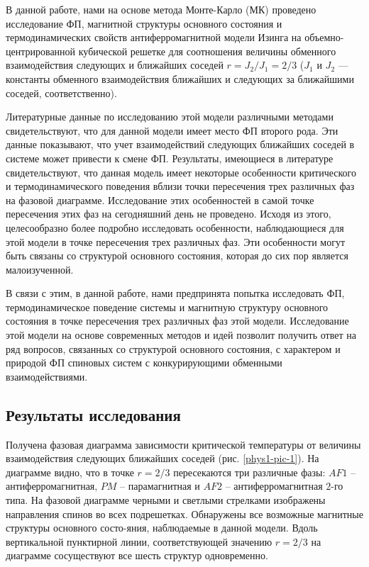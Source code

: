 В данной работе, нами на основе метода Монте-Карло (МК) проведено исследование ФП, магнитной структуры основного состояния и термодинамических свойств антиферромагнитной модели Изинга на объемно-центрированной кубической решетке для соотношения величины обменного взаимодействия следующих и ближайших соседей $r=J_2/J_1=2/3$ ($J_1$ и $J_2$ --- константы обменного взаимодействия ближайших и следующих за ближайшими соседей, соответственно).

Литературные данные по исследованию этой модели различными методами свидетельствуют, что для данной модели имеет место ФП второго рода. Эти данные показывают, что учет взаимодействий следующих ближайших соседей в системе может привести к смене ФП. Результаты, имеющиеся в литературе свидетельствуют, что данная модель имеет некоторые особенности критического и термодинамического поведения вблизи точки пересечения трех различных фаз на фазовой диаграмме. Исследование этих особенностей в самой точке пересечения этих фаз на сегодняшний день не проведено. Исходя из этого, целесообразно более подробно исследовать особенности, наблюдающиеся для этой модели в точке пересечения трех различных фаз. Эти особенности могут быть связаны со структурой основного состояния, которая до сих пор является малоизученной.

В связи с этим, в данной работе, нами предпринята попытка исследовать ФП, термодинамическое поведение системы и магнитную структуру основного состояния в точке пересечения трех различных фаз этой модели. Исследование этой модели на основе современных методов и идей позволит получить ответ на ряд вопросов, связанных со структурой основного состояния, с характером и природой ФП спиновых систем с конкурирующими обменными взаимодействиями.



\subsection{Результаты исследования}



Получена фазовая диаграмма зависимости критической температуры от величины взаимодействия следующих ближайших соседей (рис. \ref{phys1-pic-1}). На диаграмме видно, что в точке $r=2/3$ пересекаются три различные фазы: $AF1$ -- антиферромагнитная, $PM$ -- парамагнитная и $AF2$ -- антиферромагнитная $2$-го типа. На фазовой диаграмме черными и светлыми стрелками изображены направления спинов во всех подрешетках. Обнаружены все возможные магнитные структуры основного состо-яния, наблюдаемые в данной модели. Вдоль вертикальной пунктирной линии, соответствующей значению $r=2/3$ на диаграмме сосуществуют все шесть структур одновременно.


